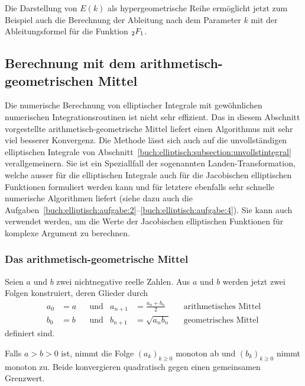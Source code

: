 Die Darstellung von $E(k)$ als hypergeometrische Reihe ermöglicht
jetzt zum Beispiel auch die Berechnung der Ableitung nach dem
Parameter $k$ mit der Ableitungsformel für die Funktion $\mathstrut_2F_1$.


%
%
\subsection{Berechnung mit dem arithmetisch-geometrischen Mittel
\label{buch:elliptisch:subsection:agm}}
Die numerische Berechnung von elliptischer Integrale mit gewöhnlichen
numerischen Integrationsroutinen ist nicht sehr effizient.
Das in diesem Abschnitt vorgestellte arithmetisch-geometrische Mittel
%
liefert einen Algorithmus mit sehr viel besserer Konvergenz.
Die Methode lässt sich auch auf die unvollständigen elliptischen
Integrale von Abschnitt~\eqref{buch:elliptisch:subsection:unvollstintegral}
verallgemeinern.
Sie ist ein Speziallfall der sogenannten Landen-Transformation,
%
welche ausser für die elliptischen Integrale auch für die 
Jacobischen elliptischen Funktionen formuliert werden kann und
für letztere ebenfalls sehr schnelle numerische Algorithmen liefert
(siehe dazu auch die
Aufgaben~\ref{buch:elliptisch:aufgabe:2}--\ref{buch:elliptisch:aufgabe:4}).
Sie kann auch verwendet werden, um die Werte der Jacobischen elliptischen
Funktionen für komplexe Argument zu berechnen.

%
%
\subsubsection{Das arithmetisch-geometrische Mittel}
Seien $a$ und $b$ zwei nichtnegative reelle Zahlen.
Aus $a$ und $b$ werden jetzt zwei Folgen konstruiert, deren Glieder
durch
\begin{align*}
a_0&=a &&\text{und}& a_{n+1} &= \frac{a_n+b_n}2 &&\text{arithmetisches Mittel}
\\
b_0&=b &&\text{und}& b_{n+1} &= \sqrt{a_nb_n}   &&\text{geometrisches Mittel}
\end{align*}
definiert sind.

\begin{satz}
Falls $a>b>0$ ist, nimmt die Folge $(a_k)_{k\ge 0}$ monoton ab und
$(b_k)_{k\ge 0}$ nimmt monoton zu.
Beide konvergieren quadratisch gegen einen gemeinsamen Grenzwert.
\end{satz}

